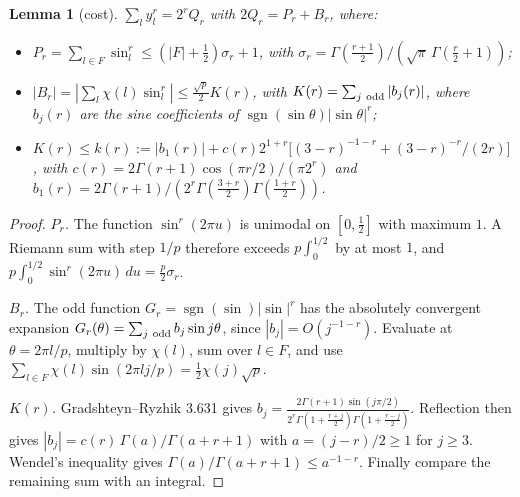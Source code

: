 \documentclass[11pt]{article}
\newtheorem{lemma}[theorem]{Lemma}
\theoremstyle{remark}\newtheorem{remark}[theorem]{Remark}
\begin{document}
\begin{lemma}[cost]\label{lem:cost}
$\sum_l y_l^r=2^r Q_r$ with $2Q_r=P_r+B_r$, where:
\begin{itemize}
\item $P_r=\sum_{l\in F}\sin_l^r\le(|F|+\tfrac12)\sigma_r+1$, with $\sigma_r=\Gamma(\frac{r+1}2)/(\sqrt\pi\,\Gamma(\frac r2+1))$;
\item $|B_r|=|\sum_l\chi(l)\sin_l^r|\le\tfrac{\sqrt p}2 K(r)$, with $K(r)=\sum_{j\ \rm odd}|b_j(r)|$, where $b_j(r)$ are the
sine coefficients of $\operatorname{sgn}(\sin\theta)|\sin\theta|^r$;
\item $K(r)\le k(r):=|b_1(r)|+c(r)2^{1+r}\big[(3-r)^{-1-r}+(3-r)^{-r}/(2r)\big]$, with
$c(r)=2\Gamma(r+1)\cos(\pi r/2)/(\pi2^r)$ and $b_1(r)=2\Gamma(r+1)/(2^r\Gamma(\frac{3+r}2)\Gamma(\frac{1+r}2))$.
\end{itemize}
\end{lemma}
\begin{proof}
\emph{$P_r$.} The function $\sin^r(2\pi u)$ is unimodal on $[0,\tfrac12]$ with maximum $1$. A Riemann sum with step $1/p$
therefore exceeds $p\int_0^{1/2}$ by at most $1$, and $p\int_0^{1/2}\sin^r(2\pi u)\,du=\tfrac p2\sigma_r$.

\emph{$B_r$.} The odd function $G_r=\operatorname{sgn}(\sin)|\sin|^r$ has the absolutely convergent expansion
$G_r(\theta)=\sum_{j\ \rm odd}b_j\sin j\theta$, since $|b_j|=O(j^{-1-r})$. Evaluate at $\theta=2\pi l/p$, multiply by
$\chi(l)$, sum over $l\in F$, and use $\sum_{l\in F}\chi(l)\sin(2\pi lj/p)=\tfrac12\chi(j)\sqrt p$.

\emph{$K(r)$.} Gradshteyn--Ryzhik 3.631 gives
$b_j=\frac{2\Gamma(r+1)\sin(j\pi/2)}{2^r\Gamma(1+\frac{r+j}2)\Gamma(1+\frac{r-j}2)}$. Reflection then gives
$|b_j|=c(r)\,\Gamma(a)/\Gamma(a+r+1)$ with $a=(j-r)/2\ge1$ for $j\ge3$. Wendel's inequality gives
$\Gamma(a)/\Gamma(a+r+1)\le a^{-1-r}$. Finally compare the remaining sum with an integral.
\end{proof}
\end{document}
